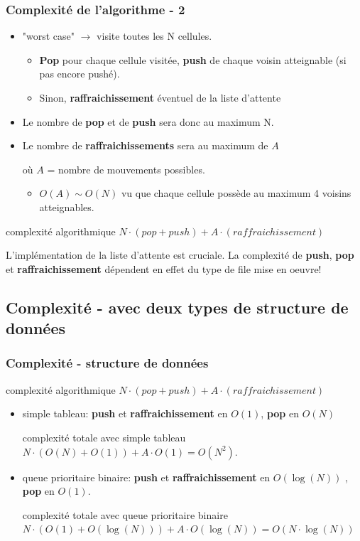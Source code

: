 \documentclass[]{beamer}
\begin{document}
\begin{frame}
  \frametitle{Complexité de l'algorithme - 2}
  \begin{itemize}
  \item "worst case" $\rightarrow$ visite toutes les N cellules. 
   \begin{itemize} 
   \item \textbf {Pop} pour chaque cellule visitée, \textbf {push} de chaque voisin atteignable (si pas encore pushé). 
   \item Sinon, \textbf {raffraichissement} éventuel de la liste d'attente 
   \end{itemize}
  \item Le nombre de \textbf {pop} et de \textbf {push} sera donc au maximum N.
  \item Le nombre de \textbf {raffraichissements} sera au maximum de $A$ 

  où $A$ = nombre de mouvements possibles.
    \begin{itemize} 
    \item $O({A}) \sim O({N})$ vu que chaque cellule possède au maximum 4 voisins atteignables.
    \end{itemize}
   \end{itemize}
  \begin{block}{complexité algorithmique}
  $N \cdot (pop + push) + A \cdot (raffraichissement)$
  \end{block}
   L'implémentation de la liste d'attente est cruciale.  La complexité de \textbf {push}, \textbf {pop} et \textbf {raffraichissement} dépendent en effet du type de file mise en oeuvre!
\end{frame}

\subsection{Complexité - avec deux types de structure de données}
\begin{frame}
  \frametitle{Complexité - structure de données}
  \begin{block}{complexité algorithmique}
  $N \cdot (pop + push) + A \cdot (raffraichissement)$
  \end{block}
  \begin{itemize}
  \item simple tableau:
  \textbf {push} et \textbf {raffraichissement} en $O(1)$, \textbf {pop} en $O(N)$
  \begin{block}{complexité totale avec simple tableau}
  $N \cdot (O(N) + O(1)) + A \cdot O(1) = O(N^2)$. 
  \end{block}
  \item queue prioritaire binaire:
  \textbf {push} et \textbf {raffraichissement} en $O(\log(N))$ ,  \textbf {pop} en $O(1)$.
  \begin{block}{complexité totale avec queue prioritaire binaire}
  $N \cdot (O(1) + O(\log(N))) + A \cdot O(\log(N)) = O(N \cdot \log(N))$
  \end{block}
  \end{itemize}
\end{frame}
\end{document}
